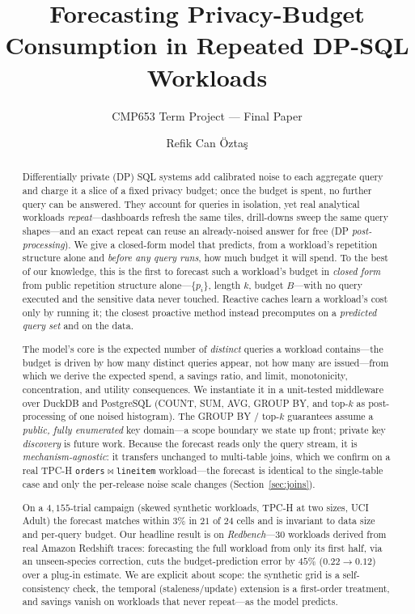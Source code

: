 \documentclass[sigconf,nonacm]{acmart}
\begin{document}
\title{Forecasting Privacy-Budget Consumption in Repeated DP-SQL Workloads}
\subtitle{CMP653 Term Project --- Final Paper}

\author{Refik Can \"Ozta\c{s}}

\begin{abstract}
Differentially private (DP) SQL systems add calibrated noise to each aggregate query and charge it a slice of a fixed privacy budget; once the budget is spent, no further query can be answered. They account for queries in isolation, yet real analytical workloads \emph{repeat}---dashboards refresh the same tiles, drill-downs sweep the same query shapes---and an exact repeat can reuse an already-noised answer for free (DP \emph{post-processing}). We give a closed-form model that predicts, from a workload's repetition structure alone and \emph{before any query runs}, how much budget it will spend. To the best of our knowledge, this is the first to forecast such a workload's budget in \emph{closed form} from public repetition structure alone---$\{p_i\}$, length $k$, budget $B$---with no query executed and the sensitive data never touched. Reactive caches learn a workload's cost only by running it; the closest proactive method instead precomputes on a \emph{predicted query set} and on the data.

The model's core is the expected number of \emph{distinct} queries a workload contains---the budget is driven by how many distinct queries appear, not how many are issued---from which we derive the expected spend, a savings ratio, and limit, monotonicity, concentration, and utility consequences. We instantiate it in a unit-tested middleware over DuckDB and PostgreSQL (COUNT, SUM, AVG, GROUP BY, and top-$k$ as post-processing of one noised histogram). The GROUP BY / top-$k$ guarantees assume a \emph{public, fully enumerated} key domain---a scope boundary we state up front; private key \emph{discovery} is future work. Because the forecast reads only the query stream, it is \emph{mechanism-agnostic}: it transfers unchanged to multi-table joins, which we confirm on a real TPC-H \texttt{orders}$\bowtie$\texttt{lineitem} workload---the forecast is identical to the single-table case and only the per-release noise scale changes (Section~\ref{sec:joins}).

On a $4{,}155$-trial campaign (skewed synthetic workloads, TPC-H at two sizes, UCI Adult) the forecast matches within $3\%$ in $21$ of $24$ cells and is invariant to data size and per-query budget. Our headline result is on \emph{Redbench}---$30$ workloads derived from real Amazon Redshift traces: forecasting the full workload from only its first half, via an unseen-species correction, cuts the budget-prediction error by $45\%$ ($0.22\!\to\!0.12$) over a plug-in estimate. We are explicit about scope: the synthetic grid is a self-consistency check, the temporal (staleness/update) extension is a first-order treatment, and savings vanish on workloads that never repeat---as the model predicts.
\end{abstract}
\end{document}
